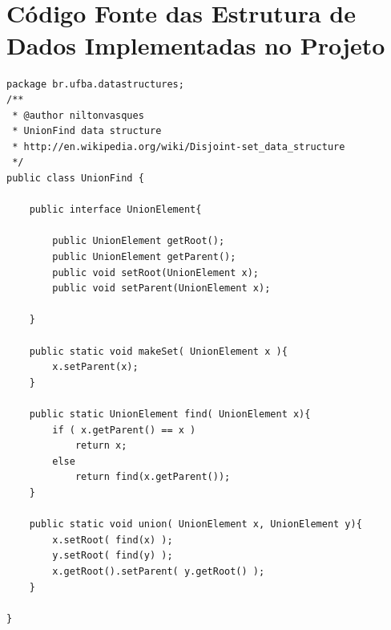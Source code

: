 \documentclass[a4paper,12pt]{article}
\begin{document}
\section{\\Código Fonte das Estrutura de Dados Implementadas no Projeto} \label{App:AppendixE}
\begin{lstlisting}[title=Interface Para Operações Union-Find com Lista Encadeada]
package br.ufba.datastructures;
/**
 * @author niltonvasques
 * UnionFind data structure
 * http://en.wikipedia.org/wiki/Disjoint-set_data_structure
 */
public class UnionFind {

	public interface UnionElement{

		public UnionElement getRoot();
		public UnionElement getParent();
		public void setRoot(UnionElement x);
		public void setParent(UnionElement x);

	}

	public static void makeSet( UnionElement x ){
		x.setParent(x);		
	}

	public static UnionElement find( UnionElement x){
		if ( x.getParent() == x )
			return x;
		else
			return find(x.getParent());
	}

	public static void union( UnionElement x, UnionElement y){
		x.setRoot( find(x) );
		y.setRoot( find(y) );		
		x.getRoot().setParent( y.getRoot() );
	}

}
\end{lstlisting}
\end{document}
